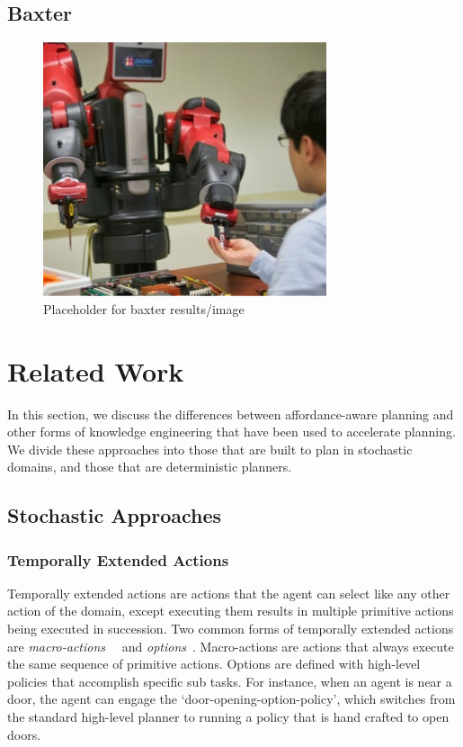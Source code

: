 \documentclass[conference]{IEEEtran}
\begin{document}
\subsection{Baxter}

\begin{figure}[H]
\centering
\includegraphics[scale=0.195]{figures/baxter_temp.jpg}%
  \caption{Placeholder for baxter results/image}
  \label{fig:baxter_results}
\end{figure}

\section{Related Work}
\label{sec:related-work}

In this section, we discuss the differences between
affordance-aware planning and other forms of knowledge engineering that
have been used to accelerate planning. We divide these approaches
into those that are built to plan in stochastic domains, and those that are
deterministic planners.

\subsection{Stochastic Approaches}

\subsubsection{Temporally Extended Actions}
Temporally extended actions are actions that the agent can
select like any other action of the domain, except executing them
results in multiple primitive actions being executed in
succession. Two common forms of temporally extended actions are {\em
  macro-actions}~\cite{hauskrecht98} ~and {\em options}~\cite{sutton99}. 
Macro-actions are actions that always
execute the same sequence of primitive actions. Options are defined
with high-level policies that accomplish specific sub tasks. For
instance, when an agent is near a door, the agent can engage the
`door-opening-option-policy', which switches from the standard
high-level planner to running a policy that is hand crafted to open
doors. 
\end{document}
